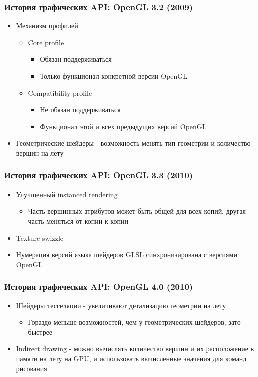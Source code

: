 \documentclass{beamer}
\begin{document}
\begin{frame}
\frametitle{История графических API: OpenGL 3.2 (2009)}
\begin{itemize}
\item Механизм профилей
\begin{itemize}
\item Core profile
\begin{itemize}
\item Обязан поддерживаться
\item Только функционал конкретной версии OpenGL
\end{itemize}
\item Compatibility profile
\begin{itemize}
\item Не обязан поддерживаться
\item Функционал этой и всех предыдущих версий OpenGL
\end{itemize}
\end{itemize}
\pause
\item Геометрические шейдеры - возможность менять тип геометрии и количество вершин на лету
\end{itemize}
\end{frame}

\begin{frame}
\frametitle{История графических API: OpenGL 3.3 (2010)}
\begin{itemize}
\item Улучшенный instanced rendering
\begin{itemize}
\item Часть вершинных атрибутов может быть общей для всех копий, другая часть меняться от копии к копии
\end{itemize}
\pause
\item Texture swizzle
\pause
\item Нумерация версий языка шейдеров GLSL синхронизирована с версиями OpenGL
\end{itemize}
\end{frame}

\begin{frame}
\frametitle{История графических API: OpenGL 4.0 (2010)}
\begin{itemize}
\item Шейдеры тесселяции - увеличивают детализацию геометрии на лету
\begin{itemize}
\item Гораздо меньше возможностей, чем у геометрических шейдеров, зато быстрее
\end{itemize}
\pause
\item Indirect drawing - можно вычислять количество вершин и их расположение в памяти на лету на GPU, и использовать вычисленные значения для команд рисования
\end{itemize}
\end{frame}
\end{document}
